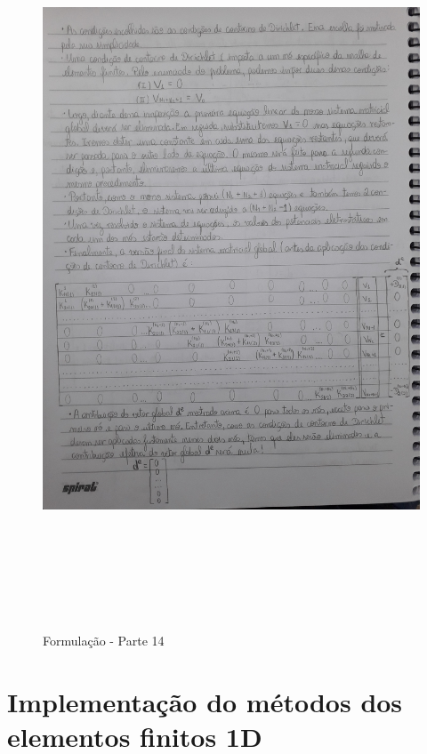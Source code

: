 \documentclass[10pt]{article}
\begin{document}
    \begin{figure}[!htb]
    \centerline{\includegraphics[width=20cm,height=22cm]{Formulação Matemática/Formulacao - Parte 14.jpg}}
    \caption{Formulação - Parte 14}
    \label{fig:fp14}
    \end{figure}
    

\section{Implementação do métodos dos elementos finitos 1D}
    
\end{document}
